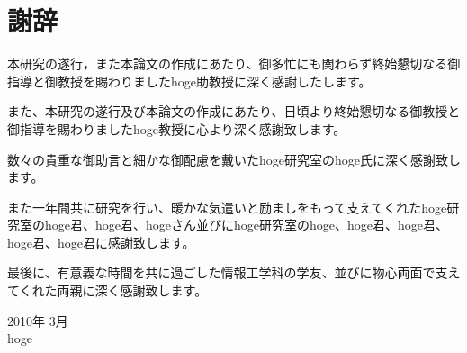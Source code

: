 \chapter*{謝辞}
\thispagestyle{empty}


\hspace{1zw}本研究の遂行，また本論文の作成にあたり、御多忙にも関わらず終始懇切なる御指導と御教授を賜わりましたhoge助教授に深く感謝したします。

また、本研究の遂行及び本論文の作成にあたり、日頃より終始懇切なる御教授と御指導を賜わりましたhoge教授に心より深く感謝致します。

数々の貴重な御助言と細かな御配慮を戴いたhoge研究室のhoge氏に深く感謝致します。

また一年間共に研究を行い、暖かな気遣いと励ましをもって支えてくれたhoge研究室のhoge君、hoge君、hogeさん並びにhoge研究室のhoge、hoge君、hoge君、hoge君、hoge君に感謝致します。

最後に、有意義な時間を共に過ごした情報工学科の学友、並びに物心両面で支えてくれた両親に深く感謝致します。

\begin{flushright}
 2010年 3月 \\ hoge
\end{flushright}


